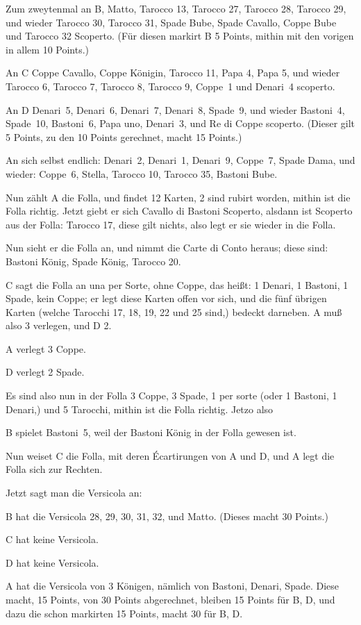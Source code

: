 \documentclass[11pt,a6paper,twoside]{article}
\begin{document}
Zum zweytenmal an B, Matto, Tarocco 13, Tarocco 27, Tarocco 28, Tarocco 29, und wieder Tarocco 30, Tarocco 31, Spade Bube, Spade Cavallo, Coppe Bube und Tarocco 32 Scoperto. (Für diesen markirt B 5 Points, mithin mit den vorigen in allem 10 Points.)

An C Coppe Cavallo, Coppe Königin, Tarocco 11, Papa 4, Papa 5, und wieder Tarocco 6, Tarocco 7, Tarocco 8, Tarocco 9, Coppe~1 und Denari~4 scoperto.

An D Denari~5, Denari~6, Denari~7, Denari~8, Spade~9, und wieder Bastoni~4, Spade~10, Bastoni~6, Papa uno, Denari~3, und Re di Coppe scoperto. (Dieser gilt 5 Points, zu den 10 Points gerechnet, macht 15 Points.)

An sich selbst endlich: Denari~2, Denari~1, Denari~9, Coppe~7, Spade Dama, und wieder: Coppe~6, Stella, Tarocco 10, Tarocco 35, Bastoni Bube.

Nun zählt A die Folla, und findet 12 Karten, 2 sind rubirt worden, mithin ist die Folla richtig. Jetzt giebt er sich Cavallo di Bastoni Scoperto, alsdann ist Scoperto aus der Folla: Tarocco 17, diese gilt nichts, also legt er sie wieder in die Folla.

Nun sieht er die Folla an, und nimmt die Carte di Conto heraus; diese sind: Bastoni König, Spade König, Tarocco 20.

C sagt die Folla an una per Sorte, ohne Coppe, das heißt: 1 Denari, 1 Bastoni, 1 Spade, kein Coppe; er legt diese Karten offen vor sich, und die fünf übrigen Karten (welche Tarocchi 17, 18, 19, 22 und 25 sind,) bedeckt darneben. A muß also 3 verlegen, und D 2.

A verlegt 3 Coppe.

D verlegt 2 Spade.

Es sind also nun in der Folla 3 Coppe, 3 Spade, 1 per sorte (oder 1 Bastoni, 1 Denari,) und 5 Tarocchi, mithin ist die Folla richtig. Jetzo also



B spielet Bastoni~5, weil der Bastoni König in der Folla gewesen ist.

Nun weiset C die Folla, mit deren Écartirungen von A und D, und A legt die Folla sich zur Rechten.

Jetzt sagt man die Versicola an:

B hat die Versicola 28, 29, 30, 31, 32, und Matto. (Dieses macht 30 Points.)

C hat keine Versicola.

D hat keine Versicola.

A hat die Versicola von 3 Königen, nämlich von Bastoni, Denari, Spade.
Diese macht, 15 Points, von 30 Points abgerechnet, bleiben 15 Points für B, D, und dazu die schon markirten 15 Points, macht 30 für B, D.
\end{document}
